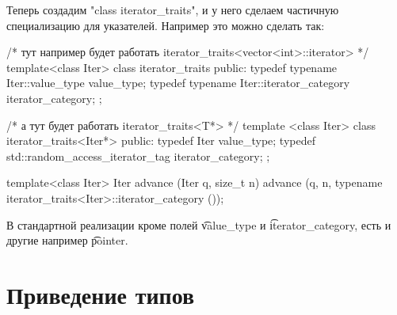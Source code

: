 Теперь создадим \cpp"class iterator_traits", и у него сделаем частичную специализацию для указателей.
Например это можно сделать так:
\begin{cppcode}
/* тут например будет работать iterator_traits<vector<int>::iterator> */
template<class Iter>
class iterator_traits {
public:
    typedef typename Iter::value_type value_type;
    typedef typename Iter::iterator_category iterator_category;
};

/* а тут будет работать iterator_traits<T*> */
template <class Iter> 
class iterator_traits<Iter*> {
public:
    typedef Iter value_type;
    typedef std::random_access_iterator_tag iterator_category;
};

template<class Iter>
Iter advance (Iter q, size_t n) {
    advance (q, n, typename iterator_traits<Iter>::iterator_category ());
}
\end{cppcode}
В стандартной реализации кроме полей \t{value\_type} и \t{iterator\_category}, есть и другие например \t{pointer}.

\section{Приведение типов}
